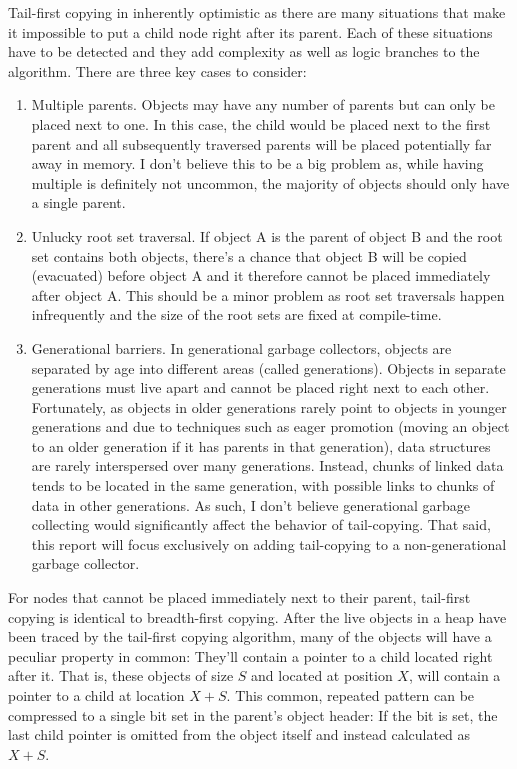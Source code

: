 \documentclass[a4paper,oneside]{memoir}
\begin{document}
Tail-first copying in inherently optimistic as there are many situations that
make it impossible to put a child node right after its parent. Each of these
situations have to be detected and they add complexity as well as logic branches
to the algorithm. There are three key cases to consider:
\begin{enumerate}
  \item Multiple parents. Objects may have any number of parents but can only be
  placed next to one. In this case, the child would be placed next to the first
  parent and all subsequently traversed parents will be placed potentially far
  away in memory. I don't believe this to be a big problem as, while having
  multiple is definitely not uncommon, the majority of objects should only have
  a single parent.
  \item
  Unlucky root set traversal. If object A is the parent of object B and the root
  set contains both objects, there's a chance that object B will be copied
  (evacuated) before object A and it therefore cannot be placed immediately
  after object A. This should be a minor problem as root set traversals happen
  infrequently and the size of the root sets are fixed at compile-time.
  \item
  Generational barriers. In generational garbage collectors, objects are
  separated by age into different areas (called generations). Objects in
  separate generations must live apart and cannot be placed right next to each
  other. Fortunately, as objects in older generations rarely point to objects in
  younger generations and due to techniques such as eager promotion (moving an
  object to an older generation if it has parents in that generation), data
  structures are rarely interspersed over many generations. Instead, chunks of
  linked data tends to be located in the same generation, with possible links
  to chunks of data in other generations. As such, I don't believe generational
  garbage collecting would significantly affect the behavior of tail-copying.
  That said, this report will focus exclusively on adding tail-copying to a
  non-generational garbage collector.
\end{enumerate}

For nodes that cannot be placed immediately next to their parent, tail-first
copying is identical to breadth-first copying.
\newline
\newline
After the live objects in a heap have been traced by the tail-first copying
algorithm, many of the objects will have a peculiar property in common: They'll
contain a pointer to a child located right after it. That is, these objects
of size $S$ and located at position $X$, will contain a pointer to a child at
location $X+S$. This common, repeated pattern can be compressed to a single bit
set in the parent's object header: If the bit is set, the last child pointer is
omitted from the object itself and instead calculated as $X+S$.
\end{document}
